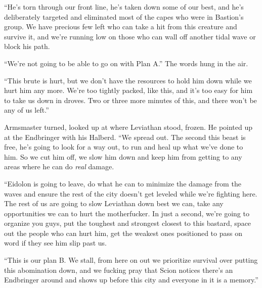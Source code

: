 ``He's torn through our front line, he's taken down some of our best, and he's deliberately targeted and eliminated most of the capes who were in Bastion's group.  We have precious few left who can take a hit from this creature and survive it, and we're running low on those who can wall off another tidal wave or block his path.



``We're not going to be able to go on with Plan A.''  The words hung in the air.



``This brute is hurt, but we don't have the resources to hold him down while we hurt him any more.  We're too tightly packed, like this, and it's too easy for him to take us down in droves.   Two or three more minutes of this, and there won't be any of us left.''



Armsmaster turned, looked up at where Leviathan stood, frozen.  He pointed up at the Endbringer with his Halberd.  ``We spread out.  The second this beast is free, he's going to look for a way out, to run and heal up what we've done to him.   So we cut him off, we slow him down and keep him from getting to any areas where he can do \emph{real} damage.



``Eidolon is going to leave, do what he can to minimize the damage from the waves and ensure the rest of the city doesn't get leveled while we're fighting here.  The rest of us are going to slow Leviathan down best we can, take any opportunities we can to hurt the motherfucker.  In just a second, we're going to organize you guys, put the toughest and strongest closest to this bastard, space out the people who can hurt him, get the weakest ones positioned to pass on word if they see him slip past us.



``This is our plan B.  We stall, from here on out we prioritize survival over putting this abomination down, and we fucking pray that Scion notices there's an Endbringer around and shows up before this city and everyone in it is a memory.''





